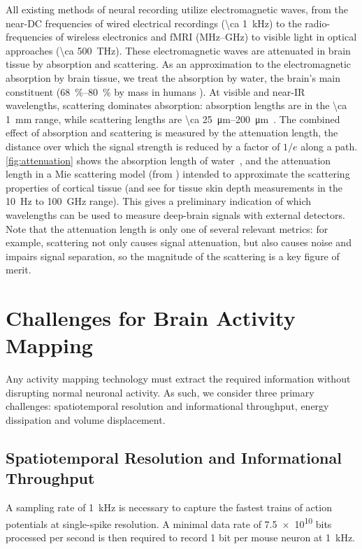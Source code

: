 All existing methods of neural recording utilize electromagnetic waves, from the near-DC frequencies of wired electrical recordings (\SI{\ca 1}{\kilo\hertz}) to the radio-frequencies of wireless electronics and fMRI (MHz--GHz) to visible light in optical approaches (\SI{\ca 500}{\tera\hertz}).
These electromagnetic waves are attenuated in brain tissue by absorption and scattering.
As an approximation to the electromagnetic absorption by brain tissue, we treat the absorption by water, the brain's main constituent (\SIrange{68}{80}{\percent} by mass in humans \cite{dobbing73,fatouros99}).
At visible and near-IR wavelengths, scattering dominates absorption: absorption lengths are in the \SI{\ca 1}{\milli\meter} range, while scattering lengths are \SIrange{\ca 25}{200}{\micro\meter}~\cite{Wilt2009}. The combined effect of absorption and scattering is measured by the attenuation length, the distance over which the signal strength is reduced by a factor of $1/e$ along a path.
\autoref{fig:attenuation} shows the absorption length of water~\cite{kou93}, and the attenuation length in a Mie scattering model (from \cite{horton13}) intended to approximate the scattering properties of cortical tissue (and see \cite{gabriel1996} for tissue skin depth measurements in the \SI{10}{\hertz} to \SI{100}{\giga\hertz} range).
This gives a preliminary indication of which wavelengths can be used to measure deep-brain signals with external detectors. Note that the attenuation length is only one of several relevant metrics: for example, scattering not only causes signal attenuation, but also causes noise and impairs signal separation, so the magnitude of the scattering is a key figure of merit.

\section{Challenges for Brain Activity Mapping}
\label{sec:challenges}
Any activity mapping technology must extract the required information without disrupting normal neuronal activity.
As such, we consider three primary challenges: spatiotemporal resolution and informational throughput, energy dissipation and volume displacement.

\subsection{Spatiotemporal Resolution and Informational Throughput}

A sampling rate of \SI{1}{\kilo\hertz} is necessary to capture the fastest trains of action potentials at single-spike resolution.
A minimal data rate of \num{7.5e10} bits processed per second is then required to record 1 bit per mouse neuron at \SI{1}{\kilo\hertz}.

